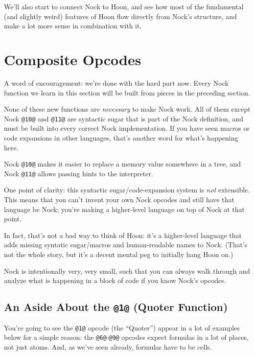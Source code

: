 \documentclass[twoside]{article}
\begin{document}
We'll also start to connect Nock to Hoon, and see how most of the fundamental (and slightly weird) features of Hoon flow directly from Nock's structure, and make a lot more sense in combination with it.

\section{Composite Opcodes}

A word of encouragement: we're done with the hard part now. Every Nock function we learn in this section will be built from pieces in the preceding section.

None of these new functions are \emph{necessary} to make Nock work. All of them except Nock \lstinline[style=inlinecode]{@10@} and \lstinline[style=inlinecode]{@11@} are syntactic sugar that is part of the Nock definition, and must be built into every correct Nock implementation. If you have seen macros or code expansions in other languages, that's another word for what's happening here.

Nock \lstinline[style=inlinecode]{@10@} makes it easier to replace a memory value somewhere in a tree, and Nock \lstinline[style=inlinecode]{@11@} allows passing hints to the interpreter.

One point of clarity: this syntactic sugar/code-expansion system is \emph{not} extensible. This means that you can't invent your own Nock opcodes and still have that language be Nock; you're making a higher-level language on top of Nock at that point.

In fact, that's not a bad way to think of Hoon: it's a higher-level language that adds missing syntatic sugar/macros and human-readable names to Nock. (That's not the whole story, but it's a decent mental peg to initially hang Hoon on.)

Nock is intentionally very, very small, such that you can always walk through and analyze what is happening in a block of code if you know Nock's opcodes.

\subsection{An Aside About the \lstinline[style=inlinecode]{@1@} (Quoter Function)}

You're going to see the \lstinline[style=inlinecode]{@1@} opcode (the “Quoter”) appear in a lot of examples below for a simple reason: the \lstinline[style=inlinecode]{@6@}-\lstinline[style=inlinecode]{@9@} opcodes expect formulas in a lot of places, not just atoms. And, as we've seen already, formulas have to be cells.
\end{document}

